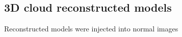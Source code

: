 \subsection{3D cloud reconstructed models}
Reconstructed models were injected into normal images




